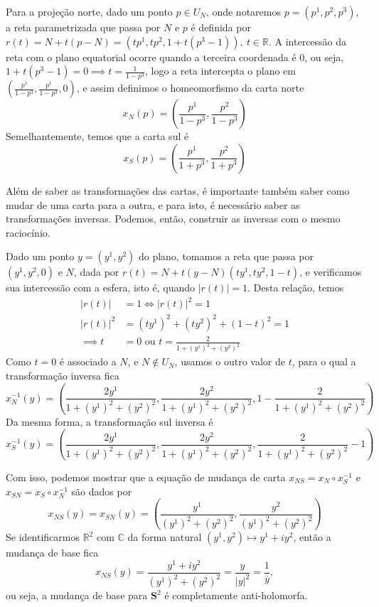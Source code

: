 \documentclass[a4paper,12pt,notitlepage]{article}
\newcommand{\R}{\mathbb{R}}
\newcommand{\C}{\mathbb{C}}
\renewcommand{\S}{\mathbf{S}}
\begin{document}
	Para a projeção norte, dado um ponto $p\in U_N$, onde notaremos $p=(p^1,p^2,p^3)$, a reta parametrizada que passa por $N$ e $p$ é definida por $r(t)=N+t(p-N)=(tp^1,tp^2,1+t(p^3-1)),\ t\in\R$. A intercessão da reta com o plano equatorial ocorre quando a terceira coordenada é 0, ou seja, $1+t(p^3-1)=0\implies t=\frac{1}{1-p^3}$, logo a reta intercepta o plano em $(\frac{p^1}{1-p^3},\frac{p^1}{1-p^3},0)$, e assim definimos o homeomorfismo da carta norte
	\begin{equation}
		x_N(p)=(\frac{p^1}{1-p^3},\frac{p^2}{1-p^3})
	\end{equation}
	Semelhantemente, temos que a carta sul é
	\begin{equation}
		x_S(p)=(\frac{p^1}{1+p^3},\frac{p^2}{1+p^3})
	\end{equation}
	
	Além de saber as transformações das cartas, é importante também saber como mudar de uma carta para a outra, e para isto, é necessário saber as transformações inversas. Podemos, então, construir as inversas com o mesmo raciocínio.
	
	Dado um ponto $y=(y^1,y^2)$ do plano, tomamos a reta que passa por $(y^1,y^2,0)$ e $N$, dada por $r(t)=N+t(y-N)(ty^1,ty^2,1-t)$, e verificamos sua intercessão com a esfera, isto é, quando $|r(t)|=1$. Desta relação, temos
	\begin{align*}
		|r(t)|&=1\iff|r(t)|^2=1\\
		|r(t)|^2&=(ty^1)^2+(ty^2)^2+(1-t)^2=1\\
		\implies t&=0\text{ ou }t=\frac{2}{1+(y^1)^2+(y^2)^2}
	\end{align*}
	Como $t=0$ é associado a $N$, e $N\not\in U_N$, usamos o outro valor de $t$, para o qual a transformação inversa fica
	\begin{equation}
		x_N^{-1}(y)=\left(\frac{2y^1}{1+(y^1)^2+(y^2)^2},\frac{2y^2}{1+(y^1)^2+(y^2)^2},1-\frac{2}{1+(y^1)^2+(y^2)^2}\right)
	\end{equation}
	Da mesma forma, a transformação sul inversa é
	\begin{equation}
		x_S^{-1}(y)=\left(\frac{2y^1}{1+(y^1)^2+(y^2)^2},\frac{2y^2}{1+(y^1)^2+(y^2)^2},\frac{2}{1+(y^1)^2+(y^2)^2}-1\right)
	\end{equation}
	
	Com isso, podemos mostrar que a equação de mudança de carta $x_{NS}=x_N\circ x_S^{-1}$ e $x_{SN}=x_S\circ x_N^{-1}$ são dados por
	\begin{equation}
		x_{NS}(y)=x_{SN}(y)=\left(\frac{y^1}{(y^1)^2+(y^2)^2},\frac{y^2}{(y^1)^2+(y^2)^2}\right)
	\end{equation}
	Se identificarmos $\R^2$ com $\C$ da forma natural $(y^1,y^2)\mapsto y^1+iy^2$, então a mudança de base fica 
	\[x_{NS}(y)=\frac{y^1+iy^2}{(y^1)^2+(y^2)^2}=\frac{y}{|y|^2}=\frac{1}{\bar{y}},\]
	ou seja, a mudança de base para $\S^2$ é completamente anti-holomorfa.
	
\end{document}
